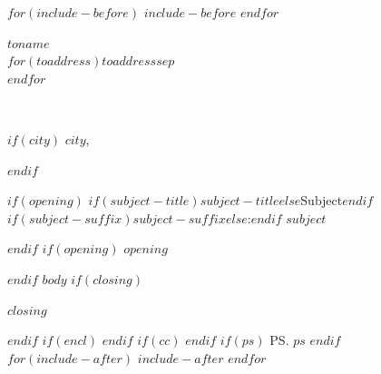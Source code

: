 \documentclass[$if(fontsize)$$fontsize$$else$11pt$endif$,a4paper,$for(classoption)$$classoption$$sep$,$endfor$]{letter}
\date{$date$}
\date{\today}
\makeatletter
\newcommand*{\recipient}{%
{\raggedleft \toname \\ \toaddress \par}%
  \vspace{2\parskip}%
}
\newcommand*{\local}{
  {\raggedleft \@date\par}%
  {$if(city)$ \raggedleft $city$, \par$endif$}%
  \vspace{2\parskip}%
}
\newcommand{\subject}{$if(subject-title)$$subject-title$$else$Subject$endif$$if(subject-suffix)$$subject-suffix$$else$:$endif$ $subject$
\vspace{2\parskip}%
\par\nobreak
}
\renewcommand*{\opening}[1]{%
  #1\par\nobreak}
\makeatother
\begin{document}
$for(include-before)$
$include-before$
$endfor$
\begin{letter}{$toname$\\$for(toaddress)$$toaddress$$sep$\\$endfor$}
  \vspace*{-5em}
\recipient
\local
$if(opening)$
\subject
$endif$
$if(opening)$
\opening{$opening$}
$endif$
$body$
$if(closing)$
\closing{$closing$}%
{\raggedleft {}}
$endif$
$if(encl)$
$endif$
$if(cc)$
$endif$
$if(ps)$
\ps{$ps$}
$endif$
$for(include-after)$
$include-after$
$endfor$
\end{letter}
\end{document}
